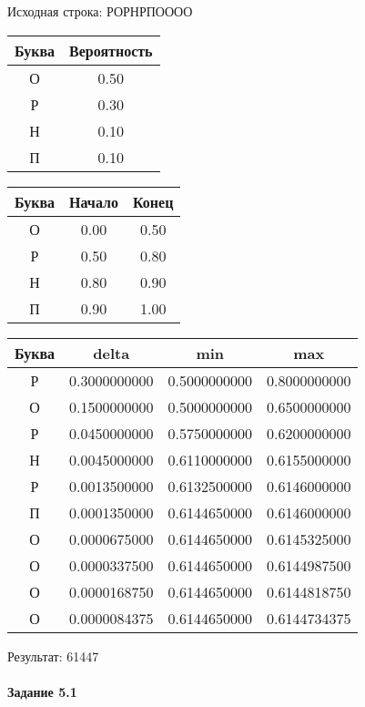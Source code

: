 \documentclass[a4paper, 12pt]{article}
\begin{document}
Исходная строка: РОРНРПОООО\
\begin{center}
 \begin{tabular}{ |c|c| } 
  \hline
     Буква & Вероятность \\ \hline
О & 0.50\\\hline
Р & 0.30\\\hline
Н & 0.10\\\hline
П & 0.10
\\ \hline \end{tabular}
\end{center}
\begin{center}
 \begin{tabular}{ |c|c|c| } 
  \hline
     Буква & Начало & Конец \\ \hline
О & 0.00 & 0.50\\\hline
Р & 0.50 & 0.80\\\hline
Н & 0.80 & 0.90\\\hline
П & 0.90 & 1.00
\\ \hline \end{tabular}
\end{center}
\begin{center}
 \begin{tabular}{ |c|c|c|c| } 
  \hline
     Буква & delta & min & max \\ \hline
Р & 0.3000000000 & 0.5000000000 & 0.8000000000\\\hline
О & 0.1500000000 & 0.5000000000 & 0.6500000000\\\hline
Р & 0.0450000000 & 0.5750000000 & 0.6200000000\\\hline
Н & 0.0045000000 & 0.6110000000 & 0.6155000000\\\hline
Р & 0.0013500000 & 0.6132500000 & 0.6146000000\\\hline
П & 0.0001350000 & 0.6144650000 & 0.6146000000\\\hline
О & 0.0000675000 & 0.6144650000 & 0.6145325000\\\hline
О & 0.0000337500 & 0.6144650000 & 0.6144987500\\\hline
О & 0.0000168750 & 0.6144650000 & 0.6144818750\\\hline
О & 0.0000084375 & 0.6144650000 & 0.6144734375
\\ \hline \end{tabular}
\end{center}
Результат: 61447
\pagebreak
\paragraph{Задание 5.1 \\
}
\end{document}
